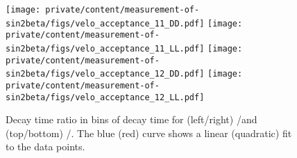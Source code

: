 \begin{figure}
  \texttt{[image: private/content/measurement-of-sin2beta/figs/velo\_acceptance\_11\_DD.pdf]}\hfill
  \texttt{[image: private/content/measurement-of-sin2beta/figs/velo\_acceptance\_11\_LL.pdf]}
  \texttt{[image: private/content/measurement-of-sin2beta/figs/velo\_acceptance\_12\_DD.pdf]}\hfill
  \texttt{[image: private/content/measurement-of-sin2beta/figs/velo\_acceptance\_12\_LL.pdf]}
\caption{
Decay time ratio in bins of decay time for (left/right) \catDD/\catLL and
(top/bottom) \catOO/\catOT. The blue (red) curve shows a linear (quadratic) fit
to the data points.}
\label{fig:measurement_of_sin2beta:resolution_and_acceptance:acceptance:upper}
\end{figure}
